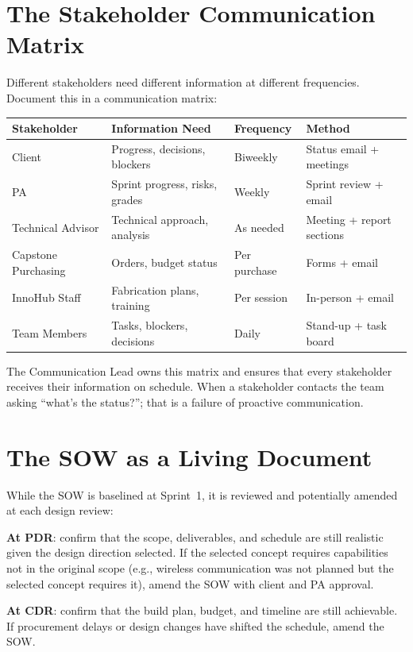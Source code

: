 \section{The Stakeholder Communication Matrix}
Different stakeholders need different information at different frequencies. Document this in a communication matrix:

\begin{center}\small
\begin{tabularx}{\textwidth}{l>{\raggedright\arraybackslash}X>{\raggedright\arraybackslash}X>{\raggedright\arraybackslash}X}
\toprule
\textbf{Stakeholder} & \textbf{Information Need} & \textbf{Frequency} & \textbf{Method} \\
\midrule
Client & Progress, decisions, blockers & Biweekly & Status email + meetings \\
PA & Sprint progress, risks, grades & Weekly & Sprint review + email \\
Technical Advisor & Technical approach, analysis & As needed & Meeting + report sections \\
Capstone Purchasing & Orders, budget status & Per purchase & Forms + email \\
InnoHub Staff & Fabrication plans, training & Per session & In-person + email \\
Team Members & Tasks, blockers, decisions & Daily & Stand-up + task board \\
\bottomrule
\end{tabularx}
\end{center}

The Communication Lead owns this matrix and ensures that every stakeholder receives their information on schedule. When a stakeholder contacts the team asking ``what's the status?''; that is a failure of proactive communication.

\section{The SOW as a Living Document}
While the SOW is baselined at Sprint~1, it is reviewed and potentially amended at each design review:

\textbf{At PDR}: confirm that the scope, deliverables, and schedule are still realistic given the design direction selected. If the selected concept requires capabilities not in the original scope (e.g., wireless communication was not planned but the selected concept requires it), amend the SOW with client and PA approval.

\textbf{At CDR}: confirm that the build plan, budget, and timeline are still achievable. If procurement delays or design changes have shifted the schedule, amend the SOW.

